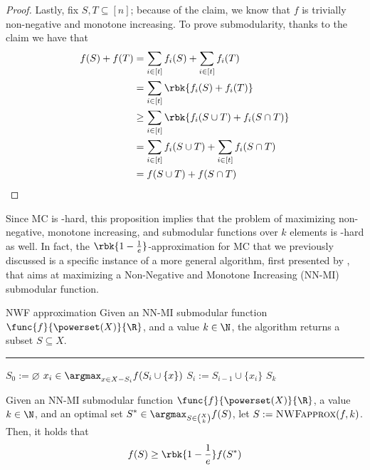 \documentclass[a4paper, 12pt]{report}
\begin{document}
\begin{proof}
        Lastly, fix $S, T \subseteq [n]$; because of the claim, we know that $f$ is trivially non-negative and monotone increasing. To prove submodularity, thanks to the claim we have that
        \begin{equation*}
            \begin{split}
                f(S) + f(T) &= \sum_{i \in [t]}{f_i(S)} + \sum_{i \in [t]}{f_i(T)} \\
                            &= \sum_{i \in [t]}{\rbk{f_i(S) + f_i(T)}} \\
                            &\ge \sum_{i \in [t]}{\rbk{f_i(S \cup T) + f_i(S \cap T)}} \\
                            &= \sum_{i \in [t]}{f_i(S \cup T)} + \sum_{i \in [t]}{f_i(S \cap T)} \\
                            &= f(S \cup T) + f(S \cap T)
            \end{split}
        \end{equation*}
    \end{proof}

    Since MC is \NPclass-hard, this proposition implies that the problem of maximizing non-negative, monotone increasing, and submodular functions over $k$ elements is \NPclass-hard as well. In fact, the $\rbk{1 - \tfrac{1}{e}}$-approximation for MC that we previously discussed is a specific instance of a more general algorithm, first presented by \textcite{nwf}, that aims at maximizing a Non-Negative and Monotone Increasing (NN-MI) submodular function.

    \begin{framedalgo}[label={nwf approx}]{NWF approximation}
        Given an NN-MI submodular function $\func{f}{\powerset(X)}{\R}$, and a value $k \in \N$, the algorithm returns a subset $S \subseteq X$. \\
        \hrule

        \quad
        \begin{algorithmic}[1]
                \State $S_0 := \varnothing$
                    \State $\displaystyle x_i \in \argmax_{x \in X - S_i}{f(S_i \cup \{x\})}$
                    \State $S_i := S_{i - 1} \cup \{x_i\}$
                \EndFor
                \State {} $S_k$
            \EndFunction
        \end{algorithmic}
    \end{framedalgo}

    \begin{framedthm}[label={nwf approx proof}]{}
        Given an NN-MI submodular function $\func{f}{\powerset(X)}{\R}$, a value $k \in \N$, and an optimal set $\displaystyle S^* \in \argmax_{S \in \binom{X}{k}}{f(S)}$, let $S := \textsc{NWFapprox}(f, k)$. Then, it holds that $$f(S) \ge \rbk{1 - \dfrac{1}{e}}f(S^*)$$
    \end{framedthm}
\end{document}
